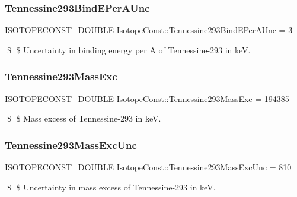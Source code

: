 \subsubsection{\texorpdfstring{Tennessine293\+Bind\+E\+Per\+A\+Unc}{Tennessine293BindEPerAUnc}}
{\footnotesize\ttfamily \mbox{\hyperlink{group___isotope_const-_macros_ga8f45a7272ce02c0b4c65c44636ed719a}{I\+S\+O\+T\+O\+P\+E\+C\+O\+N\+S\+T\+\_\+\+D\+O\+U\+B\+LE}} Isotope\+Const\+::\+Tennessine293\+Bind\+E\+Per\+A\+Unc = 3}

\$ \$ Uncertainty in binding energy per A of Tennessine-\/293 in keV. \mbox{\label{group___isotope_const-_tennessine-_ts293_ga176c372b982b5e45b0d5badc21badd40}} 
\subsubsection{\texorpdfstring{Tennessine293\+Mass\+Exc}{Tennessine293MassExc}}
{\footnotesize\ttfamily \mbox{\hyperlink{group___isotope_const-_macros_ga8f45a7272ce02c0b4c65c44636ed719a}{I\+S\+O\+T\+O\+P\+E\+C\+O\+N\+S\+T\+\_\+\+D\+O\+U\+B\+LE}} Isotope\+Const\+::\+Tennessine293\+Mass\+Exc = 194385}

\$ \$ Mass excess of Tennessine-\/293 in keV. \mbox{\label{group___isotope_const-_tennessine-_ts293_ga3980a10c8f5f123423e9a3ece4e2a1b6}} 
\subsubsection{\texorpdfstring{Tennessine293\+Mass\+Exc\+Unc}{Tennessine293MassExcUnc}}
{\footnotesize\ttfamily \mbox{\hyperlink{group___isotope_const-_macros_ga8f45a7272ce02c0b4c65c44636ed719a}{I\+S\+O\+T\+O\+P\+E\+C\+O\+N\+S\+T\+\_\+\+D\+O\+U\+B\+LE}} Isotope\+Const\+::\+Tennessine293\+Mass\+Exc\+Unc = 810}

\$ \$ Uncertainty in mass excess of Tennessine-\/293 in keV. \mbox{\label{group___isotope_const-_tennessine-_ts293_gadc671c6a20706d5b1cdd80bec119aab9}} 
